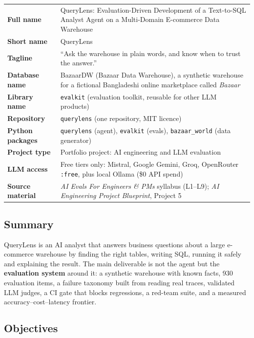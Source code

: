\documentclass[11pt,a4paper]{article}
\newcommand{\code}[1]{\texttt{\small #1}}
\begin{document}
\begin{center}
\begin{tabularx}{\linewidth}{@{}>{\bfseries}l X@{}}
\toprule
Full name & QueryLens: Evaluation-Driven Development of a Text-to-SQL Analyst Agent on a Multi-Domain E-commerce Data Warehouse\\
Short name & QueryLens\\
Tagline & ``Ask the warehouse in plain words, and know when to trust the answer.''\\
Database name & BazaarDW (Bazaar Data Warehouse), a synthetic warehouse for a fictional Bangladeshi online marketplace called \emph{Bazaar}\\
Library name & \code{evalkit} (evaluation toolkit, reusable for other LLM products)\\
Repository & \code{querylens} (one repository, MIT licence)\\
Python packages & \code{querylens} (agent), \code{evalkit} (evals), \code{bazaar\_world} (data generator)\\
Project type & Portfolio project: AI engineering and LLM evaluation\\
LLM access & Free tiers only: Mistral, Google Gemini, Groq, OpenRouter \code{:free}, plus local Ollama (\$0 API spend)\\
Source material & \emph{AI Evals For Engineers \& PMs} syllabus (L1--L9); \emph{AI Engineering Project Blueprint}, Project 5\\
\bottomrule
\end{tabularx}
\end{center}

\subsection{Summary}

QueryLens is an AI analyst that answers business questions about a large e-commerce warehouse
by finding the right tables, writing SQL, running it safely and explaining the result. The main
deliverable is not the agent but the \textbf{evaluation system} around it: a synthetic warehouse
with known facts, 930 evaluation items, a failure taxonomy built from reading real traces,
validated LLM judges, a CI gate that blocks regressions, a red-team suite, and a measured
accuracy--cost--latency frontier.

\subsection{Objectives}
\end{document}
